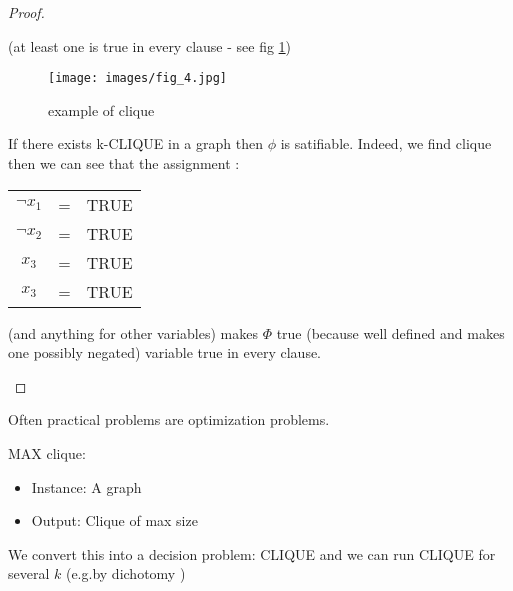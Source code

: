 \begin{proof}
\begin{itemize}
(at least one is true in every clause - see fig \ref{c12:clique2})

\begin{figure}[h!!]
\centering
\texttt{[image: images/fig\_4.jpg]}
\caption{example of clique}
\label{c12:clique2}
\end{figure}

If there exists k-CLIQUE in a graph then $\phi$ is satifiable.
 Indeed, we find clique then we can see that the assignment : \\
 
 \begin{center}
\begin{tabular}{ccc}
$ \neg x_1$ & =& TRUE \\
$\neg x_2$ & =& TRUE \\
 $x_3$ & =& TRUE \\
 $x_3$ & =& TRUE \\
\end{tabular}
\end{center}
(and anything for other variables) makes $\Phi$ true (because well defined and makes one possibly negated) variable true in every clause.\\
\end{itemize}
\end{proof}

Often practical problems are optimization problems.\\

\begin{definition}
MAX clique:
\begin{itemize}
\item Instance: A graph
\item Output:  Clique of max size
\end{itemize}

We convert this into a decision problem: CLIQUE and we can run CLIQUE for several $k$ (e.g.by dichotomy )
\end{definition}